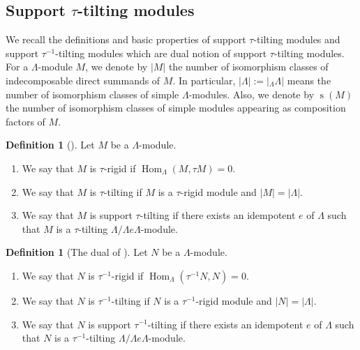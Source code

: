 \documentclass[pdftex,a4paper]{article}
\numberwithin{equation}{subsection}
\theoremstyle{definition}
\newtheorem{definition}[theorem]{Definition}
\newcommand{\Hom}{\operatorname{Hom}\nolimits}
\newcommand{\nscf}{\operatorname{\mathrm{s}}}
\begin{document}
\subsection{Support \texorpdfstring{\(\tau\)}{tau}-tilting modules}
We recall the definitions and basic properties of support \(\tau\)-tilting modules and support \(\tau^{-1}\)-tilting modules which are dual notion of support \(\tau\)-tilting modules.
For a \(\Lambda\)-module \(M\), we denote by \(|M|\) the number of isomorphism classes of indecomposable direct summands of \(M\).
In particular, \(|\Lambda|:=|{}_\Lambda \Lambda |\) means the number of isomorphism classes of simple \(\Lambda\)-modules.
Also, we denote by \(\nscf(M)\) the number of isomorphism classes of simple modules appearing as composition factors of \(M\).
\begin{definition}[{\cite[Definition 0.1]{MR3187626}}]
	Let \(M\) be a \(\Lambda\)-module.
	\begin{enumerate}
		\item We say that \(M\) is \(\tau\)-rigid if \(\Hom_{\Lambda}(M,\tau M)=0\).
		\item We say that \(M\) is \(\tau\)-tilting if \(M\) is a \(\tau\)-rigid module and \(|M|=|\Lambda|.\)
		\item We say that \(M\) is support \(\tau\)-tilting if there exists an idempotent \(e\) of \(\Lambda\) such that \(M\) is a \(\tau\)-tilting \(\Lambda/\Lambda e\Lambda \)-module.
	\end{enumerate}
\end{definition}

\begin{definition}[{The dual of \cite[Definition 0.1]{MR3187626}}]
	Let \(N\) be a \(\Lambda\)-module.
	\begin{enumerate}
		\item We say that \(N\) is \(\tau^{-1}\)-rigid if \(\Hom_{\Lambda}(\tau^{-1}N,N)=0.\)
		\item We say that \(N\) is \(\tau^{-1}\)-tilting if \(N\) is a \(\tau^{-1}\)-rigid module and \(|N|=|\Lambda|.\)
		\item We say that \(N\) is support \(\tau^{-1}\)-tilting if there exists an idempotent \(e\) of \(\Lambda\) such that \(N\) is a \(\tau^{-1}\)-tilting \(\Lambda/\Lambda e\Lambda \)-module.
	\end{enumerate}
\end{definition}
\end{document}
